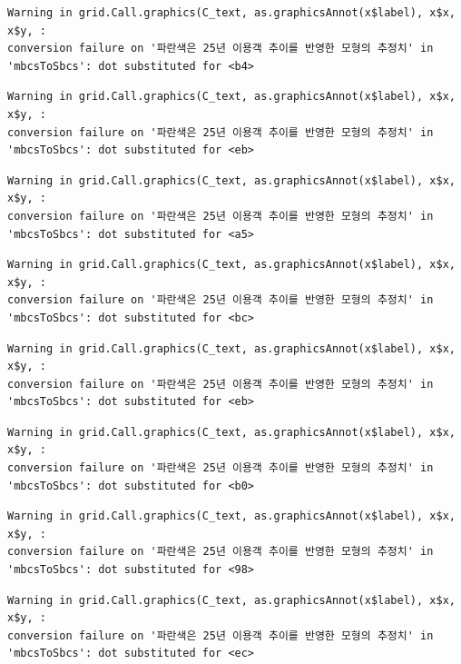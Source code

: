 \documentclass[
  letterpaper,
  DIV=11,
  numbers=noendperiod]{scrreprt}
\begin{document}
\begin{verbatim}
Warning in grid.Call.graphics(C_text, as.graphicsAnnot(x$label), x$x, x$y, :
conversion failure on '파란색은 25년 이용객 추이를 반영한 모형의 추정치' in
'mbcsToSbcs': dot substituted for <b4>
\end{verbatim}

\begin{verbatim}
Warning in grid.Call.graphics(C_text, as.graphicsAnnot(x$label), x$x, x$y, :
conversion failure on '파란색은 25년 이용객 추이를 반영한 모형의 추정치' in
'mbcsToSbcs': dot substituted for <eb>
\end{verbatim}

\begin{verbatim}
Warning in grid.Call.graphics(C_text, as.graphicsAnnot(x$label), x$x, x$y, :
conversion failure on '파란색은 25년 이용객 추이를 반영한 모형의 추정치' in
'mbcsToSbcs': dot substituted for <a5>
\end{verbatim}

\begin{verbatim}
Warning in grid.Call.graphics(C_text, as.graphicsAnnot(x$label), x$x, x$y, :
conversion failure on '파란색은 25년 이용객 추이를 반영한 모형의 추정치' in
'mbcsToSbcs': dot substituted for <bc>
\end{verbatim}

\begin{verbatim}
Warning in grid.Call.graphics(C_text, as.graphicsAnnot(x$label), x$x, x$y, :
conversion failure on '파란색은 25년 이용객 추이를 반영한 모형의 추정치' in
'mbcsToSbcs': dot substituted for <eb>
\end{verbatim}

\begin{verbatim}
Warning in grid.Call.graphics(C_text, as.graphicsAnnot(x$label), x$x, x$y, :
conversion failure on '파란색은 25년 이용객 추이를 반영한 모형의 추정치' in
'mbcsToSbcs': dot substituted for <b0>
\end{verbatim}

\begin{verbatim}
Warning in grid.Call.graphics(C_text, as.graphicsAnnot(x$label), x$x, x$y, :
conversion failure on '파란색은 25년 이용객 추이를 반영한 모형의 추정치' in
'mbcsToSbcs': dot substituted for <98>
\end{verbatim}

\begin{verbatim}
Warning in grid.Call.graphics(C_text, as.graphicsAnnot(x$label), x$x, x$y, :
conversion failure on '파란색은 25년 이용객 추이를 반영한 모형의 추정치' in
'mbcsToSbcs': dot substituted for <ec>
\end{verbatim}
\end{document}
